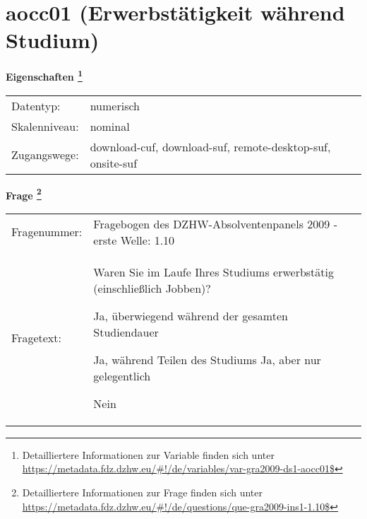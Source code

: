 
    \setcounter{footnote}{0}

    \vspace*{-1.8cm}
	\section{aocc01 (Erwerbstätigkeit während Studium)}
	\label{section:aocc01}



    \vspace*{0.5cm}
    \noindent\textbf{Eigenschaften
	\footnote{Detailliertere Informationen zur Variable finden sich unter
		\url{https://metadata.fdz.dzhw.eu/\#!/de/variables/var-gra2009-ds1-aocc01$}}}\\
	\begin{tabularx}{\hsize}{@{}lX}
	Datentyp: & numerisch \\
	Skalenniveau: & nominal \\
	Zugangswege: &
	  download-cuf, 
	  download-suf, 
	  remote-desktop-suf, 
	  onsite-suf
 \\
    \end{tabularx}



				\vspace*{0.5cm}
                \noindent\textbf{Frage
	                \footnote{Detailliertere Informationen zur Frage finden sich unter
		              \url{https://metadata.fdz.dzhw.eu/\#!/de/questions/que-gra2009-ins1-1.10$}}}\\
				\begin{tabularx}{\hsize}{@{}lX}
					Fragenummer: &
					  Fragebogen des DZHW-Absolventenpanels 2009 - erste Welle:
					  1.10
 \\
					Fragetext: & Waren Sie im Laufe Ihres Studiums erwerbstätig (einschließlich Jobben)?\par  Ja, überwiegend während der gesamten Studiendauer\par  Ja, während Teilen des Studiums Ja, aber nur gelegentlich\par  Nein \\
				\end{tabularx}





